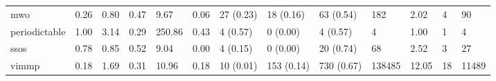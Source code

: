 \begin{table}
\begin{tabular}{m{3.5cm}m{2cm}m{2cm}m{2cm}m{2cm}m{2cm}m{2cm}m{2cm}m{2cm}m{2cm}m{2cm}m{2cm}m{2cm}}
mwo                     &                0.26 &                  0.80 &                   0.47 &               9.67 &               0.06 &   27 (0.23) &   18 (0.16) &    63 (0.54) &             182 &     2.02 &          4 &                90 \\
periodictable           &                1.00 &                  3.14 &                   0.29 &             250.86 &               0.43 &    4 (0.57) &    0 (0.00) &     4 (0.57) &               4 &     1.00 &          1 &                 4 \\
ssos                    &                0.78 &                  0.85 &                   0.52 &               9.04 &               0.00 &    4 (0.15) &    0 (0.00) &    20 (0.74) &              68 &     2.52 &          3 &                27 \\
vimmp                   &                0.18 &                  1.69 &                   0.31 &              10.96 &               0.18 &   10 (0.01) &  153 (0.14) &   730 (0.67) &          138485 &    12.05 &         18 &             11489 \\
\bottomrule
\end{tabular}
\end{table}
